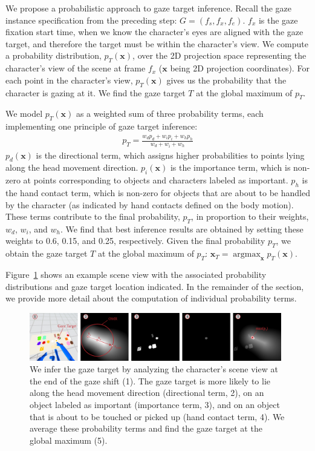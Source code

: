 We propose a probabilistic approach to gaze target inference. Recall the gaze instance specification from the preceding step: $G = (f_s, f_x, f_e)$. $f_x$ is the gaze fixation start time, when we know the character's eyes are aligned with the gaze target, and therefore the target must be within the character's view. We compute a probability distribution, $p_T(\mathbf{x})$, over the 2D projection space representing the character's view of the scene at frame $f_x$ ($\mathbf{x}$ being 2D projection coordinates). For each point in the character's view, $p_T(\mathbf{x})$ gives us the probability that the character is gazing at it. We find the gaze target $T$ at the global maximum of $p_T$.

We model $p_T(\mathbf{x})$ as a weighted sum of three probability terms, each implementing one principle of gaze target inference:
%
\begin{align} \label{eq:GazeTargetGlobalProbability}
p_T = \frac{w_d p_d + w_i p_i + w_h p_h}{w_d + w_i + w_h}
\end{align}
%
$p_d(\mathbf{x})$ is the directional term, which assigns higher probabilities to points lying along the head movement direction. $p_i(\mathbf{x})$ is the importance term, which is non-zero at points corresponding to objects and characters labeled as important. $p_h$ is the hand contact term, which is non-zero for objects that are about to be handled by the character (as indicated by hand contacts defined on the body motion). These terms contribute to the final probability, $p_T$, in proportion to their weights, $w_d$, $w_i$, and $w_h$. We find that best inference results are obtained by setting these weights to 0.6, 0.15, and 0.25, respectively. Given the final probability $p_T$, we obtain the gaze target $T$ at the global maximum of $p_T$: $\mathbf{x}_T = \mathop{argmax}_{\mathbf{x}} p_T(\mathbf{x})$.

Figure~\ref{fig:GazeTargetInference} shows an example scene view with the associated probability distributions and gaze target location indicated. In the remainder of the section, we provide more detail about the computation of individual probability terms.

\begin{figure}
\centering
\includegraphics[width=0.98\textwidth]{Figures/GazeTargetInference.pdf}
\caption{We infer the gaze target by analyzing the character's scene view at the end of the gaze shift (1). The gaze target is more likely to lie along the head movement direction (directional term, 2), on an object labeled as important (importance term, 3), and on an object that is about to be touched or picked up (hand contact term, 4). We average these probability terms and find the gaze target at the global maximum (5).}
\label{fig:GazeTargetInference}
\end{figure}


